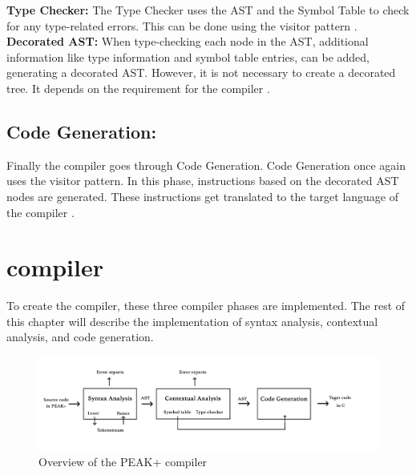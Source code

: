 \noindent\textbf{Type Checker:} The Type Checker uses the AST and the Symbol Table to check for any type-related errors. This can be done using the visitor pattern \cite{SPO_Topic_3}. \\

\noindent\textbf{Decorated AST:} When type-checking each node in the AST, additional information like type information and symbol table entries, can be added, generating a decorated AST. However, it is not necessary to create a decorated tree. It depends on the requirement for the compiler \cite{SPO_Topic_3}.

\subsection{Code Generation:} Finally the compiler goes through Code Generation. Code Generation once again uses the visitor pattern. In this phase, instructions based on the decorated AST nodes are generated. These instructions get translated to the target language of the compiler \cite{SPO_Topic_3}.

\section{\lang compiler} \label{peakCompiler}
To create the \lang compiler, these three compiler phases are implemented. The rest of this chapter will describe the implementation of syntax analysis, contextual analysis, and code generation. \\

\begin{figure}[H] 
    \begin{center}
        \includegraphics[width=1\textwidth]{Files/Billeder: Impl/OverviewCompiler.jpg}
    \end{center}
    \caption{Overview of the PEAK+ compiler}
    \label{I:Figurue:PEAKCompiler}
\end{figure}

